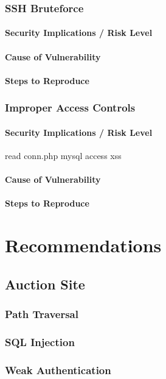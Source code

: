 \documentclass{report}
\begin{document}
\subsection{SSH Bruteforce}
\subsubsection{Security Implications / Risk Level}
\subsubsection{Cause of Vulnerability}

\subsubsection{Steps to Reproduce}
\subsection{Improper Access Controls}
\subsubsection{Security Implications / Risk Level}
	read conn.php
	mysql access
	xss
\subsubsection{Cause of Vulnerability}
\subsubsection{Steps to Reproduce}




\chapter{Recommendations}
\section{Auction Site}
\subsection{Path Traversal}
\subsection{SQL Injection}
\subsection{Weak Authentication}
\end{document}
